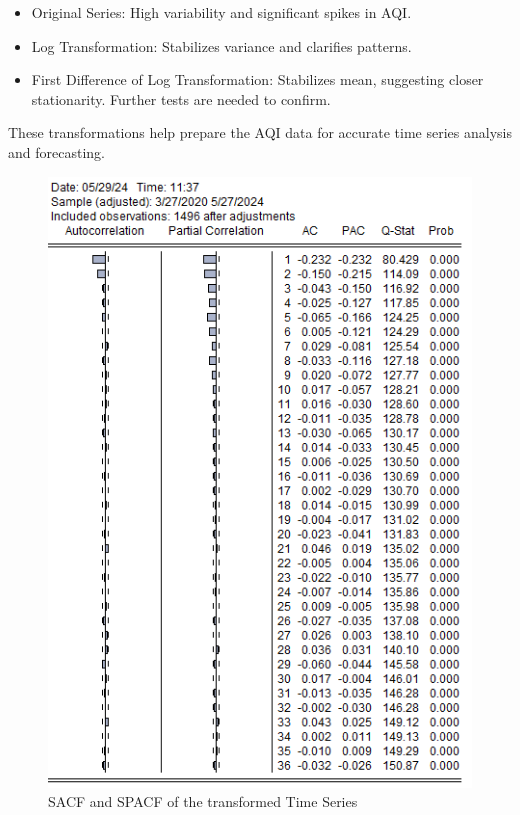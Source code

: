 \documentclass{article} %
\begin{document}
\begin{itemize}
    \item Original Series: High variability and significant spikes in AQI.
    \item Log Transformation: Stabilizes variance and clarifies patterns.
    \item First Difference of Log Transformation: Stabilizes mean, suggesting closer stationarity. Further tests are needed to confirm.
\end{itemize}

These transformations help prepare the AQI data for accurate time series analysis and forecasting.

\begin{figure}[H]
    \centering
    \begin{minipage}{0.5\linewidth}
        \includegraphics[width=\linewidth]{images/image9.png}
        \caption{SACF and SPACF of the transformed Time Series}
    \end{minipage}%
    \begin{minipage}{0.5\linewidth}

\end{minipage}
\end{figure}
\end{document}
